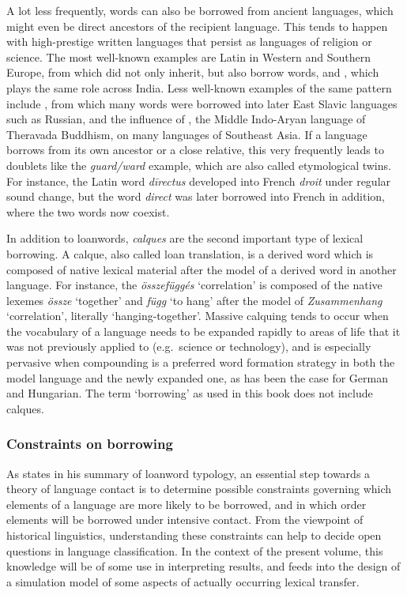 A lot less frequently, words can also be borrowed from ancient languages, which might even be direct ancestors of the recipient language. This tends to happen with high-prestige written languages that persist as languages of religion or science. The most well-known examples are Latin in Western and Southern Europe, from which  did not only inherit, but also borrow words, and , which plays the same role across India. Less well-known examples of the same pattern include , from which many words were borrowed into later East Slavic languages such as Russian, and the influence of , the Middle Indo-Aryan language of Theravada Buddhism, on many languages of Southeast Asia. If a language borrows from its own ancestor or a close relative, this very frequently leads to doublets like the \textit{guard/ward} example, which are also called etymological twins. For instance, the Latin word \textit{dīrectus} developed into French \textit{droit} under regular sound change, but the word \textit{direct} was later borrowed into French in addition, where the two words now coexist.

In addition to loanwords, \textit{calques} are the second important type of lexical borrowing. A calque, also called loan translation, is a derived word which is composed of native lexical material after the model of a derived word in another language. For instance, the  \textit{összefüggés} `correlation' is composed of the native lexemes \textit{össze} `together' and \textit{függ} `to hang' after the model of  \textit{Zusammenhang} `correlation', literally `hanging-together'. Massive calquing tends to occur when the vocabulary of a language needs to be expanded rapidly to areas of life that it was not previously applied to (e.g.\ science or technology), and is especially pervasive when compounding is a preferred word formation strategy in both the model language and the newly expanded one, as has been the case for German and Hungarian. The term `borrowing' as used in this book does not include calques.

\subsubsection{Constraints on borrowing}
As \citet{haspelmath2008} states in his summary of loanword typology, an essential step towards a theory of language contact is to determine possible constraints governing which elements of a language are more likely to be borrowed, and in which order elements will be borrowed under intensive contact. From the viewpoint of historical linguistics, understanding these constraints can help to decide open questions in language classification. In the context of the present volume, this knowledge will be of some use in interpreting results, and feeds into the design of a simulation model of some aspects of actually occurring lexical transfer.

